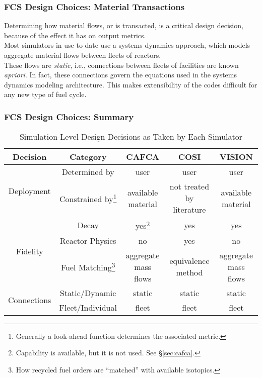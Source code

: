 \begin{frame}[ctb!]
  \frametitle{FCS Design Choices: Material Transactions}

  Determining how material flows, or is transacted, is a critical design
  decision, because of the effect it has on output metrics.\\
  
  Most simulators in use to date use a systems dynamics approach, which models
  aggregate material flows between fleets of reactors.\\

  These flows are \textit{static}, i.e., connections between fleets of
  facilities are known \textit{apriori}. In fact, these connections govern the
  equations used in the systems dynamics modeling architecture. This makes
  extensibility of the codes difficult for any new type of fuel cycle.
\end{frame}

\begin{frame}[ctb!]
  \frametitle{FCS Design Choices: Summary}
  
  \begin{savenotes}
    \begin{table} [h!]
      \centering
      \begin{tabular} {|c|c|c|c|c|}
        \hline
        Decision                     & Category & CAFCA & COSI & VISION \\ 
        \hline
        \multirow{2}{*}{Deployment}  & Determined by 
        & user & user & user \\ \cline{2-5}
        & Constrained by\footnote{Generally a look-ahead function determines the associated metric.}   
        & available material & not treated by literature & available material \\ \hline
        \multirow{3}{*}{Fidelity}    & Decay 
        & yes\footnote{Capability is available, but it is not used. See \S\ref{sec:cafca}.} & yes & yes \\ \cline{2-5}
        & Reactor Physics 
        & no & yes & no \\ \cline{2-5}
        & Fuel Matching\footnote{How recycled fuel orders are ``matched'' with available isotopics.} 
        & aggregate mass flows & equivalence method & aggregate mass flows \\ \hline
        \multirow{2}{*}{Connections} & Static/Dynamic 
        & static & static & static \\ \cline{2-5}
        & Fleet/Individual 
        & fleet & fleet & fleet \\
        \hline
      \end{tabular}
      \caption{Simulation-Level Design Decisions as Taken by Each Simulator}
      \label{tab:sim-summary}
    \end{table}
  \end{savenotes}

\end{frame}

